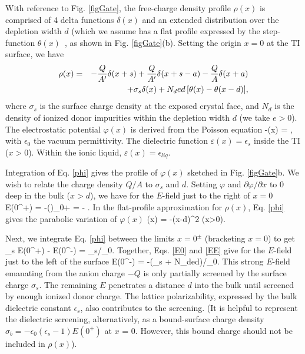 With reference to Fig. \ref{figGate}, the free-charge density profile $\rho(x)$ is comprised of 
4 delta functions $\delta(x)$ and an extended distribution over the depletion width $d$ (which we assume has a flat 
profile expressed by the step-function $\theta(x)$~\cite{Ashcroft}, as shown in Fig. \ref{figGate}(b). Setting the origin $x=0$ at the TI surface, we have
\begin{eqnarray}
\rho(x) &=& -\frac{Q}{A'}\delta(x+s) + \frac{Q}{A'}\delta(x+s-a) -\frac{Q}{A}\delta(x+a) \notag\\
 				&& +\sigma_s \delta(x) + N_ded\,[\theta(x)-\theta(x-d)],
\label{rho}
\end{eqnarray}
where $\sigma_s$ is the surface charge density at the exposed crystal face,
and $N_d$ is the density of ionized donor impurities within the depletion width $d$ (we take $e>0$). The electrostatic potential $\varphi(x)$ is derived from the Poisson equation
\be
-\varepsilon(x)  = ,
\label{phi}
\ee
with $\epsilon_0$ the vacuum permittivity. The dielectric function $\varepsilon(x) = \epsilon_s$ inside the TI ($x>0$). Within the ionic liquid,
$\varepsilon(x) = \epsilon_{liq}$.

Integration of Eq. \ref{phi} gives the profile of $\varphi(x)$ sketched in Fig. \ref{figGate}b. We wish to relate the
charge density $Q/A$ to $\sigma_s$ and $d$.
Setting $\varphi$ and $\partial\varphi/\partial x$ to 0 
deep in the bulk ($x>d$), we have for the $E$-field just to the right of $x = 0$
\be
E(0^+) = -\left(\right)_{0+} = - .
\label{E0}
\ee
In the flat-profile approximation for $\rho(x)$, Eq. \ref{phi} gives the parabolic variation of $\varphi(x)$ 
\be
\varphi(x) = -(x-d)^2   \quad (x>0).
\label{varphi}
\ee

Next, we integrate Eq. \ref{phi} between the limits $x = 0^{\pm}$ (bracketing $x =0$) to get
\be
\epsilon_s E(0^+) - E(0^-) = \sigma_s/\epsilon_0.
\label{EE}
\ee
Together, Eqs. \ref{E0} and \ref{EE} give for the $E$-field just to the left of the surface
\be
E(0^-) = -(\sigma_s + N_ded)/\epsilon_0.
\label{E0-}
\ee
This strong $E$-field emanating from the anion charge $-Q$ is only partially screened by the surface charge $\sigma_s$. The remaining
$E$ penetrates a distance $d$ into the bulk until screened by enough ionized donor charge. The lattice polarizability,
expressed by the bulk dielectric constant $\epsilon_s$,
also contributes to the screening. (It is helpful to represent the dielectric screening, alternatively, as a 
bound-surface charge density $\sigma_b = -\epsilon_0(\epsilon_s-1)E(0^+)$ at $x$ = 0. However, this bound charge
should not be included in $\rho(x)$).


